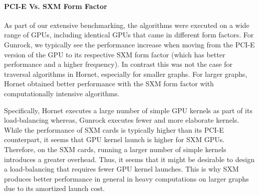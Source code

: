 \paragraph{PCI-E Vs. SXM Form Factor}
As part of our extensive benchmarking, the algorithms were executed on a wide range of GPUs, including identical GPUs that came in different form factors. For Gunrock, we typically see the performance increase when moving from the PCI-E version of the GPU to its respective SXM form factor (which has better performance and a higher frequency). In contrast this was not the case for traversal algorithms in Hornet, especially for smaller graphs. For larger graphs, Hornet obtained  better performance with the SXM form factor with computationally intensive algorithms.

Specifically, Hornet executes a large number of simple GPU kernels as part of its load-balancing whereas, Gunrock executes fewer and more elaborate kernels. While the performance of SXM cards is typically higher than its PCI-E counterpart, it seems that GPU kernel launch is higher for SXM GPUs. Therefore, on the SXM cards, running a larger number of simple kernels introduces a greater overhead. Thus, it seems that it might be desirable to design a load-balancing that requires fewer GPU kernel launches. This is why SXM produces better performance in general in heavy computations on larger graphs due to its amortized launch cost.
